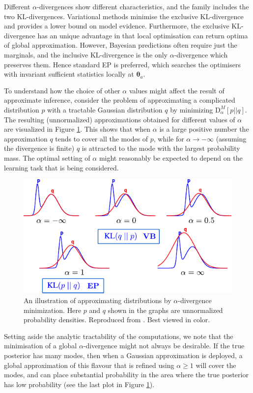 Different $\alpha$-divergences show different characteristics, and the family includes the two KL-divergences. Variational methods minimise the exclusive KL-divergence and provides a lower bound on model evidence. Furthermore, the exclusive KL-divergence has an unique advantage in that local optimisation can return optima of global approximation. However, Bayesian predictions often require just the marginals, and the inclusive KL-divergence is the only $\alpha$-divergence which preserves them. Hence standard EP is preferred, which searches the optimisers with invariant sufficient statistics locally at $\bm{\theta}_a$. 

To understand how the choice of other $\alpha$ values might affect the result of approximate inference, consider the problem of approximating a complicated distribution $p$ with a tractable Gaussian distribution $q$ by minimizing $\mathrm{D}_{\alpha}^{M}[p||q]$. The resulting (unnormalized) approximations obtained for different values of $\alpha$ are visualized in Figure \ref{fig:alpha_divergence}. This shows that when $\alpha$ is a large positive number the approximation $q$ tends to cover all the modes of $p$, while for $\alpha \rightarrow -\infty$ (assuming the divergence is finite) $q$ is attracted to the mode with the largest probability mass. The optimal setting of $\alpha$ might reasonably be expected to depend on the learning task that is being considered.

\begin{figure}
\centering
 \includegraphics[width=0.7\linewidth]{Chapter3/bbalpha/figs/alpha_divergence}
 \caption{An illustration of approximating distributions by $\alpha$-divergence minimization. Here $p$ and $q$ shown in the graphs are unnormalized probability densities. Reproduced from \citet{minka:divergence2005}. Best viewed in color.}
 \label{fig:alpha_divergence}
\end{figure}

Setting aside the analytic tractability of the computations, we note that the
minimisation of a global $\alpha$-divergence might not always be desirable. If
the true posterior has many modes, then when a Gaussian approximation is deployed, a global approximation of this flavour that
is refined using $\alpha \geq 1$ will cover the modes, and can place
substantial probability in the area where the true posterior has low
probability (see the last plot in Figure \ref{fig:alpha_divergence}). 
